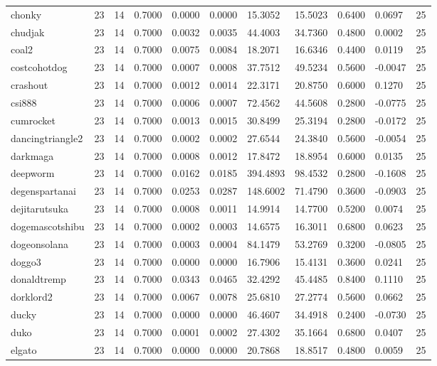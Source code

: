 \begin{table}[htbp]
\begin{tabular}{lllllllllll}
chonky & 23 & 14 & 0.7000 & 0.0000 & 0.0000 & 15.3052 & 15.5023 & 0.6400 & 0.0697 & 25 \\
chudjak & 23 & 14 & 0.7000 & 0.0032 & 0.0035 & 44.4003 & 34.7360 & 0.4800 & 0.0002 & 25 \\
coal2 & 23 & 14 & 0.7000 & 0.0075 & 0.0084 & 18.2071 & 16.6346 & 0.4400 & 0.0119 & 25 \\
costcohotdog & 23 & 14 & 0.7000 & 0.0007 & 0.0008 & 37.7512 & 49.5234 & 0.5600 & -0.0047 & 25 \\
crashout & 23 & 14 & 0.7000 & 0.0012 & 0.0014 & 22.3171 & 20.8750 & 0.6000 & 0.1270 & 25 \\
csi888 & 23 & 14 & 0.7000 & 0.0006 & 0.0007 & 72.4562 & 44.5608 & 0.2800 & -0.0775 & 25 \\
cumrocket & 23 & 14 & 0.7000 & 0.0013 & 0.0015 & 30.8499 & 25.3194 & 0.2800 & -0.0172 & 25 \\
dancingtriangle2 & 23 & 14 & 0.7000 & 0.0002 & 0.0002 & 27.6544 & 24.3840 & 0.5600 & -0.0054 & 25 \\
darkmaga & 23 & 14 & 0.7000 & 0.0008 & 0.0012 & 17.8472 & 18.8954 & 0.6000 & 0.0135 & 25 \\
deepworm & 23 & 14 & 0.7000 & 0.0162 & 0.0185 & 394.4893 & 98.4532 & 0.2800 & -0.1608 & 25 \\
degenspartanai & 23 & 14 & 0.7000 & 0.0253 & 0.0287 & 148.6002 & 71.4790 & 0.3600 & -0.0903 & 25 \\
dejitarutsuka & 23 & 14 & 0.7000 & 0.0008 & 0.0011 & 14.9914 & 14.7700 & 0.5200 & 0.0074 & 25 \\
dogemascotshibu & 23 & 14 & 0.7000 & 0.0002 & 0.0003 & 14.6575 & 16.3011 & 0.6800 & 0.0623 & 25 \\
dogeonsolana & 23 & 14 & 0.7000 & 0.0003 & 0.0004 & 84.1479 & 53.2769 & 0.3200 & -0.0805 & 25 \\
doggo3 & 23 & 14 & 0.7000 & 0.0000 & 0.0000 & 16.7906 & 15.4131 & 0.3600 & 0.0241 & 25 \\
donaldtremp & 23 & 14 & 0.7000 & 0.0343 & 0.0465 & 32.4292 & 45.4485 & 0.8400 & 0.1110 & 25 \\
dorklord2 & 23 & 14 & 0.7000 & 0.0067 & 0.0078 & 25.6810 & 27.2774 & 0.5600 & 0.0662 & 25 \\
ducky & 23 & 14 & 0.7000 & 0.0000 & 0.0000 & 46.4607 & 34.4918 & 0.2400 & -0.0730 & 25 \\
duko & 23 & 14 & 0.7000 & 0.0001 & 0.0002 & 27.4302 & 35.1664 & 0.6800 & 0.0407 & 25 \\
elgato & 23 & 14 & 0.7000 & 0.0000 & 0.0000 & 20.7868 & 18.8517 & 0.4800 & 0.0059 & 25 \\

\end{tabular}
\end{table}
